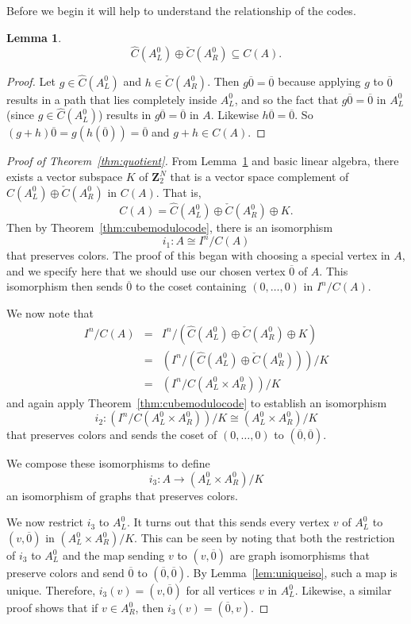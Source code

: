 \documentclass[12pt,twoside,singlespace]{article}
\numberwithin{equation}{section}
\newtheorem{lem}[equation]{Lemma}
\theoremstyle{definition}
\newcommand{\ZZ}{\mathbf{Z}}
\begin{document}
Before we begin it will help to understand the relationship of the codes.
\begin{lem}
\label{lem:cplus}
\[\hat{C}(A_L^0)\oplus \check{C}(A_R^0) \subseteq C(A).\]
\end{lem}
\begin{proof}
Let $g\in\hat{C}(A_L^0)$ and $h\in \check{C}(A_R^0)$.  Then $g\overline{0}=\overline{0}$ because applying $g$ to $\overline{0}$ results in a path that lies completely inside $A_L^0$, and so the fact that $g\overline{0}=\overline{0}$ in $A_L^0$ (since $g\in \hat{C}(A_L^0)$) results in $g\overline{0}=\overline{0}$ in $A$.  Likewise $h\overline{0}=\overline{0}$.  So $(g+h)\overline{0}=g(h(\overline{0}))=\overline{0}$ and $g+h\in C(A)$.
\end{proof}

\begin{proof}[Proof of Theorem~\ref{thm:quotient}]
From Lemma~\ref{lem:cplus} and basic linear algebra, there exists a vector subspace $K$ of $\ZZ_2^N$ that is a vector space complement of
$\hat{C}(A_L^0)\oplus \check{C}(A_R^0)$ in $C(A)$.  That is,
\[C(A)=\hat{C}(A_L^0)\oplus \check{C}(A_R^0)\oplus K.\]
Then by Theorem~\ref{thm:cubemodulocode}, there is an isomorphism
\[i_1:A\cong I^n/C(A)\]
that preserves colors.  The proof of this began with choosing a special vertex in $A$, and we specify here that we should use our chosen vertex $\overline{0}$ of $A$.  This isomorphism then sends $\overline{0}$ to the coset containing $(0,\ldots,0)$ in $I^n/C(A)$.

We now note that
\begin{eqnarray*}
I^n/C(A)
&=&I^n/(\hat{C}(A_L^0)\oplus \check{C}(A_R^0)\oplus K)\\
&=&(I^n/(\hat{C}(A_L^0)\oplus \check{C}(A_R^0)))/ K\\
&=&(I^n/C(A_L^0 \times A_R^0))/ K
\end{eqnarray*}
and again apply Theorem~\ref{thm:cubemodulocode} to establish an isomorphism
\[i_2:(I^n/C(A_L^0 \times A_R^0))/ K\cong (A_L^0\times A_R^0)/K\]
that preserves colors and sends the coset of $(0,\ldots,0)$ to $(\overline{0},\overline{0})$.

We compose these isomorphisms to define
\[i_3:A\to (A_L^0\times A_R^0)/K\]
an isomorphism of graphs that preserves colors.

We now restrict $i_3$ to $A_L^0$.  It turns out that this sends every vertex $v$ of $A_L^0$ to $(v,\overline{0})$ in $(A_L^0\times A_R^0)/K$.  This can be seen by noting that both the restriction of $i_3$ to $A_L^0$ and the map sending $v$ to $(v,\overline{0})$ are graph isomorphisms that preserve colors and send $\overline{0}$ to $(\overline{0},\overline{0})$.  By Lemma~\ref{lem:uniqueiso}, such a map is unique.  Therefore, $i_3(v)=(v,\overline{0})$ for all vertices $v$ in $A_L^0$.  Likewise, a similar proof shows that if $v\in A_R^0$, then $i_3(v)=(\overline{0},v)$.


\end{proof}
\end{document}
